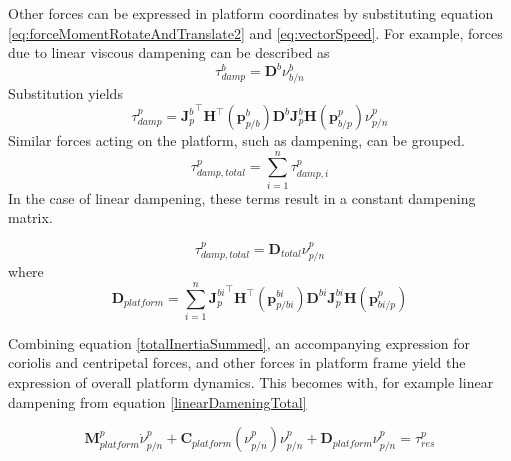 Other forces can be expressed in platform coordinates by substituting equation \ref{eq:forceMomentRotateAndTranslate2} and \ref{eq:vectorSpeed}. For example, forces due to linear viscous dampening can be described as
\begin{equation}
 \tau_{damp}^{b} = \textbf{D}^{b} \nu_{b/n}^{b}
\end{equation}
Substitution yields
\begin{equation}
\tau_{damp}^{p} = {\textbf{J}_{p}^{b}}^\top \textbf{H}^\top (\textbf{p}_{p/b}^{b}) \textbf{D}^{b} \textbf{J}_{p}^{b} \textbf{H}(\textbf{p}_{b/p}^{p}) \nu_{p/n}^{p}
\end{equation}
Similar forces acting on the platform, such as dampening, can be grouped. 
\begin{equation}
\tau_{damp,total}^{p} = \sum_{i=1}^{n} \tau_{damp,i}^{p}
\end{equation}
In the case of linear dampening, these terms result in a constant dampening matrix. 

\begin{equation}
\tau_{damp,total}^{p} = \textbf{D}_{total} \nu_{p/n}^{p} 
\label{linearDameningTotal}
\end{equation}
where 
\begin{equation}
\textbf{D}_{platform} = \sum_{i=1}^{n} {\textbf{J}_{p}^{bi}}^\top \textbf{H}^\top (\textbf{p}_{p/bi}^{bi}) \textbf{D}^{bi} \textbf{J}_{p}^{bi} \textbf{H}(\textbf{p}_{bi/p}^{p})
\end{equation}

Combining equation \ref{totalInertiaSummed}, an accompanying expression for coriolis and centripetal forces, and other forces in platform frame yield the expression of overall platform dynamics. This becomes with, for example linear dampening from equation \ref{linearDameningTotal}

\begin{equation}
\textbf{M}_{platform}^{p}  \dot{\nu}_{p/n}^{p} + \textbf{C}_{platform}(\nu_{p/n}^{p})\nu_{p/n}^{p} + \textbf{D}_{platform} \nu_{p/n}^{p}  = \tau_{res}^{p}
\label{eq:mainmodelfull}
\end{equation}

